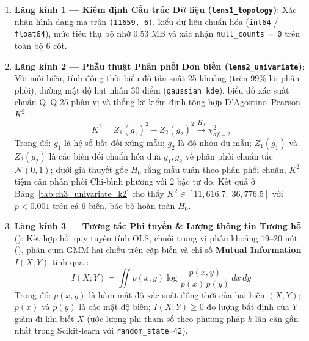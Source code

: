 \begin{enumerate}[label=\textbf{\arabic*.}]
  \item \textbf{Lăng kính 1 --- Kiểm định Cấu trúc Dữ liệu (\texttt{lens1\_topology})}: Xác nhận hình dạng ma trận \texttt{(11659, 6)}, kiểu dữ liệu chuẩn hóa (\texttt{int64} / \texttt{float64}), mức tiêu thụ bộ nhớ 0.53 MB và xác nhận \texttt{null\_counts = 0} trên toàn bộ 6 cột.
  \item \textbf{Lăng kính 2 --- Phẫu thuật Phân phối Đơn biến (\texttt{lens2\_univariate})}: Với mỗi biến, tính đồng thời biểu đồ tần suất 25 khoảng (trên 99\% lõi phân phối), đường mật độ hạt nhân 30 điểm (\texttt{gaussian\_kde}), biểu đồ xác suất chuẩn Q--Q 25 phân vị và thống kê kiểm định tổng hợp D'Agostino--Pearson $K^2$~\cite{dagostino1973tests}:
  \begin{equation}
    K^2 = Z_1(g_1)^2 + Z_2(g_2)^2 \xrightarrow{H_0} \chi^2_{df=2}
    \label{eq:ch3_dagostino}
  \end{equation}
  Trong đó: $g_1$ là hệ số bất đối xứng mẫu; $g_2$ là độ nhọn dư mẫu; $Z_1(g_1)$ và $Z_2(g_2)$ là các biến đổi chuẩn hóa đưa $g_1, g_2$ về phân phối chuẩn tắc $\mathcal{N}(0, 1)$; dưới giả thuyết gốc $H_0$ rằng mẫu tuân theo phân phối chuẩn, $K^2$ tiệm cận phân phối Chi-bình phương với 2 bậc tự do. Kết quả ở Bảng~\ref{tab:ch3_univariate_k2} cho thấy $K^2 \in [11,616.7;\; 36,776.5]$ với $p < 0.001$ trên cả 6 biến, bác bỏ hoàn toàn $H_0$.
  \item \textbf{Lăng kính 3 --- Tương tác Phi tuyến \& Lượng thông tin Tương hỗ} (): Kết hợp hồi quy tuyến tính OLS, chuỗi trung vị phân khoảng 19--20 nút (), phân cụm GMM hai chiều trên cặp biến và chỉ số \textbf{Mutual Information} $I(X; Y)$ tính qua :
  \begin{equation}
    I(X; Y) = \iint p(x, y) \log \frac{p(x, y)}{p(x)\,p(y)} \, dx \, dy
    \label{eq:ch3_mutual_info}
  \end{equation}
  Trong đó: $p(x, y)$ là hàm mật độ xác suất đồng thời của hai biến $(X, Y)$; $p(x)$ và $p(y)$ là các mật độ biên; $I(X; Y) \ge 0$ đo lượng bất định của $Y$ giảm đi khi biết $X$ (ước lượng phi tham số theo phương pháp $k$-lân cận gần nhất trong Scikit-learn với \texttt{random\_state=42}).
\end{enumerate}



